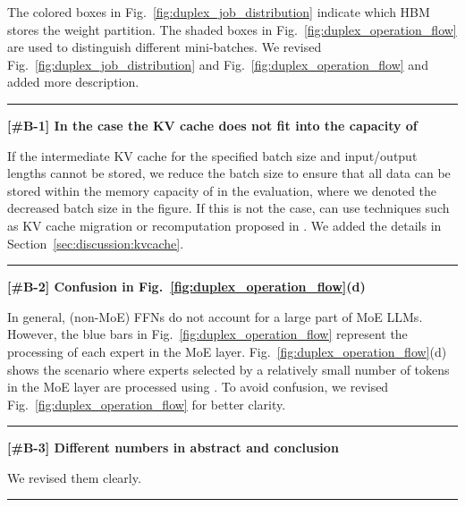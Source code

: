 The colored boxes in Fig.~\ref{fig:duplex_job_distribution} indicate which HBM stores the weight partition.
The shaded boxes in Fig.~\ref{fig:duplex_operation_flow} are used to distinguish different mini-batches.
We revised Fig.~\ref{fig:duplex_job_distribution} and Fig.~\ref{fig:duplex_operation_flow} and added more description.


\noindent
\rule[0.5ex]{8.8cm}{0.5pt}

\noindent
\textbf{[\#B-1] In the case the KV cache does not fit into the capacity of \duplex}
%

If the intermediate KV cache for the specified batch size and input/output lengths cannot be stored, we reduce the batch size to ensure that all data can be stored within the memory capacity of \duplex in the evaluation, where we denoted the decreased batch size in the figure.
If this is not the case, \duplex can use techniques such as KV cache migration or recomputation proposed in \cite{sosp-2023-pagedattention}.
We added the details in Section~\ref{sec:discussion:kvcache}.


\noindent
\rule[0.5ex]{8.8cm}{0.5pt}

\noindent
\textbf{[\#B-2] Confusion in Fig.~\ref{fig:duplex_operation_flow}(d)}
%

In general, (non-MoE) FFNs do not account for a large part of MoE LLMs. 
However, the blue bars in Fig.~\ref{fig:duplex_operation_flow} represent the processing of each expert in the MoE layer.
Fig.~\ref{fig:duplex_operation_flow}(d) shows the scenario where experts selected by a relatively small number of tokens in the MoE layer are processed using \lowp. 
To avoid confusion, we revised Fig.~\ref{fig:duplex_operation_flow} for better clarity.
%


\noindent
\rule[0.5ex]{8.8cm}{0.5pt}

\noindent
\textbf{[\#B-3] Different numbers in abstract and conclusion}
%

We revised them clearly.

\noindent
\rule[0.5ex]{8.8cm}{0.5pt}

